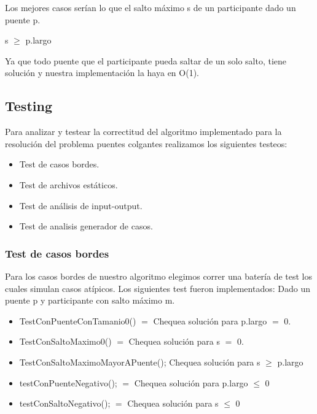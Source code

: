 Los mejores casos ser\'ian lo que el salto m\'aximo s de un participante dado un puente p.

s $\geq$ p.largo

Ya que todo puente que el participante pueda saltar de un solo salto, tiene soluci\'on y nuestra implementaci\'on la haya en O(1).

\newpage

 
\subsection{Testing}

Para analizar y testear la correctitud del algoritmo implementado para la resoluci\'on del problema puentes colgantes realizamos los siguientes testeos:

\begin{itemize}
  \item Test de casos bordes.
  \item Test de archivos est\'aticos.
  \item Test de an\'alisis de input-output.
  \item Test de analisis generador de casos.
\end{itemize}

\subsubsection{Test de casos bordes}

Para los casos bordes de nuestro algoritmo elegimos correr una bater\'ia de test los cuales simulan casos at\'ipicos.
Los siguientes test fueron implementados:
Dado un puente p y participante con salto m\'aximo m.

\begin{itemize}
  \item TestConPuenteConTamanio0() $=$ Chequea soluci\'on para p.largo $=$ 0.
  \item 	TestConSaltoMaximo0() $=$ Chequea soluci\'on para s $=$ 0.
  \item TestConSaltoMaximoMayorAPuente(); Chequea soluci\'on para s $\geq$ p.largo 
  \item testConPuenteNegativo(); $=$ Chequea soluci\'on para p.largo $\leq$ 0
  \item testConSaltoNegativo(); $=$ Chequea soluci\'on para s $\leq$ 0
\end{itemize}


